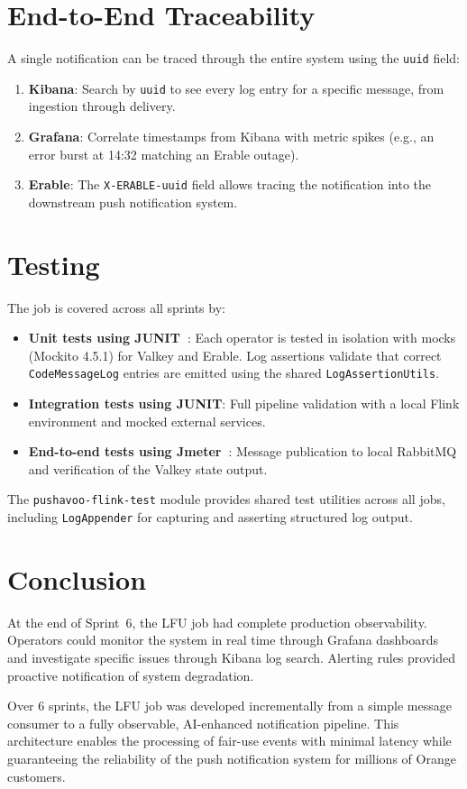 \section{End-to-End Traceability}

A single notification can be traced through the entire system using the \texttt{uuid} field:

\begin{enumerate}
    \item \textbf{Kibana}: Search by \texttt{uuid} to see every log entry for a specific message, from ingestion through delivery.
    \item \textbf{Grafana}: Correlate timestamps from Kibana with metric spikes (e.g., an error burst at 14:32 matching an Erable outage).
    \item \textbf{Erable}: The \texttt{X-ERABLE-uuid} field allows tracing the notification into the downstream push notification system.
\end{enumerate}

\section{Testing}

The job is covered across all sprints by:
\begin{itemize}
    \item \textbf{Unit tests using JUNIT~\cite{junit}}: Each operator is tested in isolation with mocks (Mockito 4.5.1) for Valkey and Erable. Log assertions validate that correct \texttt{CodeMessageLog} entries are emitted using the shared \texttt{LogAssertionUtils}.
    \item \textbf{Integration tests using JUNIT}: Full pipeline validation with a local Flink environment and mocked external services.
    \item \textbf{End-to-end tests using Jmeter~\cite{jmeter}}: Message publication to local RabbitMQ and verification of the Valkey state output.
\end{itemize}

The \texttt{pushavoo-flink-test} module provides shared test utilities across all jobs, including \texttt{LogAppender} for capturing and asserting structured log output.

\section*{Conclusion}

At the end of Sprint~6, the LFU job had complete production observability. Operators could monitor the system in real time through Grafana dashboards and investigate specific issues through Kibana log search. Alerting rules provided proactive notification of system degradation.

Over 6 sprints, the LFU job was developed incrementally from a simple message consumer to a fully observable, AI-enhanced notification pipeline. This architecture enables the processing of fair-use events with minimal latency while guaranteeing the reliability of the push notification system for millions of Orange customers.

